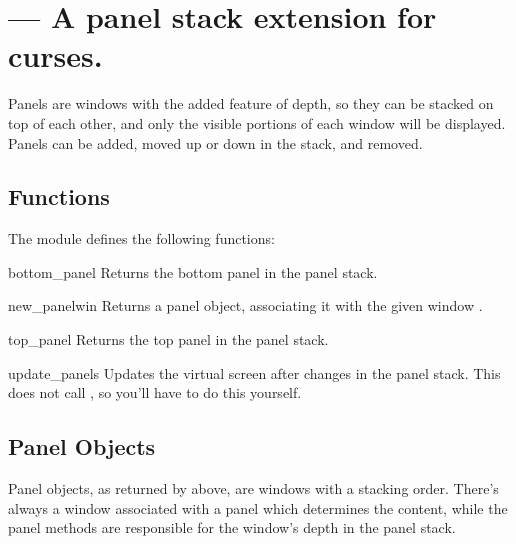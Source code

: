 \section{ ---
         A panel stack extension for curses.}


Panels are windows with the added feature of depth, so they can be
stacked on top of each other, and only the visible portions of
each window will be displayed.  Panels can be added, moved up
or down in the stack, and removed. 

\subsection{Functions \label{cursespanel-functions}}

The module  defines the following functions:


\begin{funcdesc}{bottom_panel}{}
Returns the bottom panel in the panel stack.
\end{funcdesc}

\begin{methoddesc}{new_panel}{win}
Returns a panel object, associating it with the given window .
\end{methoddesc}

\begin{funcdesc}{top_panel}{}
Returns the top panel in the panel stack.
\end{funcdesc}

\begin{funcdesc}{update_panels}{}
Updates the virtual screen after changes in the panel stack. This does
not call , so you'll have to do this yourself.
\end{funcdesc}

\subsection{Panel Objects \label{curses-panel-objects}}

Panel objects, as returned by  above, are windows
with a stacking order. There's always a window associated with a
panel which determines the content, while the panel methods are
responsible for the window's depth in the panel stack.

